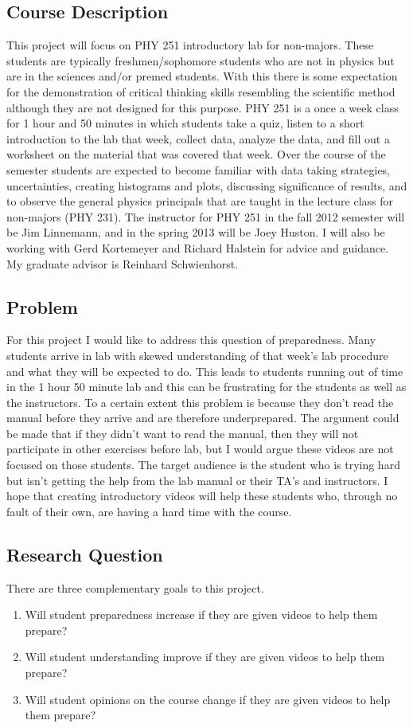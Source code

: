 \documentclass{article}
\begin{document}
\subsection{Course Description}
\hspace{0.5cm}This project will focus on PHY 251 introductory lab for non-majors. These students are typically freshmen/sophomore students who are not in physics but are in the sciences and/or premed students. With this there is some expectation for the demonstration of critical thinking skills resembling the scientific method although they are not designed for this purpose. PHY 251 is a once a week class for 1 hour and 50 minutes in which students take a quiz, listen to a short introduction to the lab that week, collect data, analyze the data, and fill out a worksheet on the material that was covered that week. Over the course of the semester students are expected to become familiar with data taking strategies, uncertainties, creating histograms and plots, discussing significance of results, and to observe the general physics principals that are taught in the lecture class for non-majors (PHY 231). The instructor for PHY 251 in the fall 2012 semester will be Jim Linnemann, and in the spring 2013 will be Joey Huston. I will also be working with Gerd Kortemeyer and Richard Halstein for advice and guidance. My graduate advisor is Reinhard Schwienhorst.
\subsection{Problem}
\hspace{0.5cm}For this project I would like to address this question of preparedness. Many students arrive in lab with skewed understanding of that week’s lab procedure and what they will be expected to do. This leads to students running out of time in the 1 hour 50 minute lab and this can be frustrating for the students as well as the instructors. To a certain extent this problem is because they don't read the manual before they arrive and are therefore underprepared. The argument could be made that if they didn't want to read the manual, then they will not participate in other exercises before lab, but I would argue these videos are not focused on those students. The target audience is the student who is trying hard but isn't getting the help from the lab manual or their TA's and instructors. I hope that creating introductory videos will help these students who, through no fault of their own, are having a hard time with the course. 
\subsection{Research Question}
There are three complementary goals to this project. 
\begin{enumerate}
\item Will student preparedness increase if they are given videos to help them prepare? 
\item Will student understanding improve if they are given videos to help them prepare? 
\item Will student opinions on the course change if they are given videos to help them prepare? 
\end{enumerate}
\end{document}
